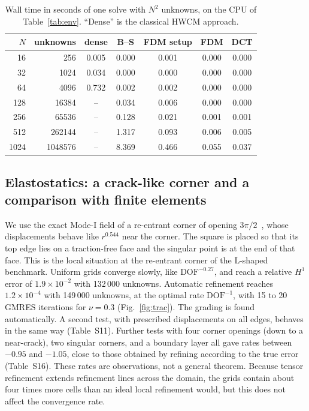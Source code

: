 \documentclass[smallextended,envcountsame]{svjour3}
\begin{document}
\begin{table}[t]\centering\footnotesize
\caption{Wall time in seconds of one solve with $N^2$ unknowns, on the CPU of Table~\ref{tab:env}. ``Dense'' is the classical
HWCM approach.}\label{tab:cost}
\begin{tabular}{rr ccccc}
\toprule
$N$ & unknowns & dense & B--S & FDM setup & FDM & DCT\\
\midrule
16 & 256 & 0.005 & 0.000 & 0.001 & 0.000 & 0.000\\
32 & 1024 & 0.034 & 0.000 & 0.000 & 0.000 & 0.000\\
64 & 4096 & 0.732 & 0.002 & 0.002 & 0.000 & 0.000\\
128 & 16384 & -- & 0.034 & 0.006 & 0.000 & 0.000\\
256 & 65536 & -- & 0.128 & 0.021 & 0.001 & 0.001\\
512 & 262144 & -- & 1.317 & 0.093 & 0.006 & 0.005\\
1024 & 1048576 & -- & 8.369 & 0.466 & 0.055 & 0.037\\
\bottomrule
\end{tabular}
\end{table}

\subsection{Elastostatics: a crack-like corner and a comparison with finite elements}\label{sec:q2}
We use the exact Mode-I field of a re-entrant corner of opening $3\pi/2$~\cite{williams1952stress}, whose
displacements behave like $r^{0.544}$ near the corner. The square is placed so that its top edge lies on a
traction-free face and the singular point is at the end of that face. This is the local situation at the
re-entrant corner of the L-shaped benchmark. Uniform grids converge slowly, like
$\mathrm{DOF}^{-0.27}$, and reach a relative $H^1$ error of $1.9\times10^{-2}$ with 132\,000 unknowns.
Automatic refinement reaches $1.2\times10^{-4}$ with 149\,000 unknowns, at the optimal rate
$\mathrm{DOF}^{-1}$, with 15 to 20 GMRES iterations for $\nu=0.3$ (Fig.~\ref{fig:trac}). The grading is found
automatically. A second test, with prescribed displacements on all edges, behaves in the same way
(Table~S11). Further tests with four corner openings (down to a near-crack), two singular corners, and a
boundary layer all gave rates between $-0.95$ and $-1.05$, close to those obtained by refining according to
the true error (Table~S16). These rates are observations, not a general theorem. Because
tensor refinement extends refinement lines across the domain, the grids contain about four times more
cells than an ideal local refinement would, but this does not affect the convergence rate.
\end{document}

